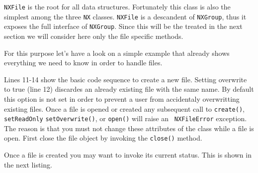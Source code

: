 {\tt NXFile} is the root for all data structures. 
Fortunately this class is also the simplest among the three {\tt NX} classes.
{\tt NXFile} is a descandent of {\tt NXGroup}, thus it exposes the full 
interface of {\tt NXGroup}. Since this will be the treated in the next 
section we will consider here only the file specific methods. 

For this purpose let's have a look on a simple example that already shows
everything we need to know in order to handle files. 

Lines 11-14 show the basic code sequence to create a new file. Setting 
overwrite to true (line 12) discardes an already existing file with the
same name. By default this option is not set in order to prevent a user 
from accidentaly overwritting existing files.
Once a file is opened or created any subsequent call to {\tt create()}, {\tt
setReadOnly} {\tt setOverwrite()}, or {\tt open()} will raise an  {\tt
NXFileError} exception.
The reason is that you must not change these attributes of the class 
while a file is open. First close the file object by invoking the 
{\tt close()} method. 

Once a file is created you may want to invoke its current status. 
This is shown in the next listing.
